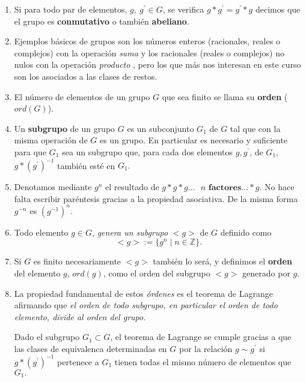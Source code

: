\begin{enumerate}
\item 	Si para todo par de elementos, $g,\ g^{\prime}\in G$, se verifica  $g*g^{\prime}= g^{\prime}*g$ decimos que el grupo es {\bf conmutativo} o tambi\'en {\bf abeliano}. 
\item Ejemplos b\'asicos de grupos son los n\'umeros enteros (racionales,  reales o complejos) con la operaci\'on  {\itshape suma} y los racionales (reales o complejos) no nulos con la operaci\'on {\itshape producto} , pero los que m\'as nos interesan en este curso son los asociados a las clases de restos.
	
\item El n\'umero de elementos de un grupo $G$ que sea finito se llama su {\bf orden} ($ord(G)$).

\item  Un {\bf subgrupo} de un grupo $G$ es un subconjunto $G_1$ de $G$ tal que con la misma operaci\'on de $G$ es un grupo. En particular es necesario y suficiente para que $G_1$ sea un subgrupo que, para cada dos elementos $g,g^{\prime}$, de $G_1$,   $g*(g^{\prime})^{-1}$ tambi\'en est\'e en $G_1.$ 

\item Denotamos mediante $g^n$ el resultado de $g*g*g\dots \textbf{ $n$ factores}\dots *g$. No hace falta escribir par\'entesis gracias a la propiedad asociativa. De la misma forma $g^{-n}$ es $(g^{-1})^n.$


\item Todo elemento $g\in G$,  {\itshape genera un subgrupo} $<g>$ de $G$ definido como 
\[<g>:=\{g^n\mid n\in \mathbb{Z}\}.\] 

\item Si $G$ es finito necesariamente $<g>$ tambi\'en lo ser\'a, y definimos el {\bf orden} del elemento $g$, $ord(g)$, como el orden del subgrupo  $<g>$ generado por $g$. 

 \item La propiedad fundamental de estos {\itshape \'ordenes} es el teorema de Lagrange afirmando que {\itshape el orden de todo subgrupo, en particular el orden de todo elemento, divide al orden del grupo. }
 
 \footnotesize
 Dado el subgrupo $G_1\subset G$, el teorema de Lagrange se cumple gracias a que las clases de equivalenca determinadas en $G$ por la relaci\'on $g\sim g^{\prime}$ si $g*(g^{\prime})^{-1}$ pertenece a $G_1$ tienen todas el mismo n\'umero de elementos que $G_1.$
 
 \normalsize
 
 \end{enumerate}

